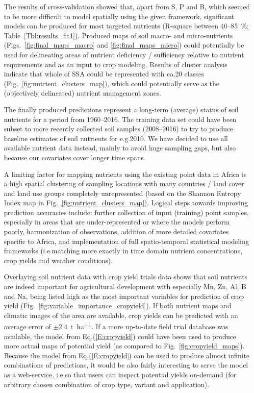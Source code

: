 \begin{linenumbers}
The results of cross-validation showed that, apart from S, P and B, which seemed to be more difficult to model spatially using the given framework, significant models can be produced for most targeted nutrients (R-square between 40--\SI{85}{\percent}; Table~\ref{Tbl:results_fit1}). Produced maps of soil macro- and micro-nutrients (Figs.\@~\ref{fig:final_maps_macro} and \ref{fig:final_maps_micro}) could potentially be used for delineating areas of nutrient deficiency / sufficiency relative to nutrient requirements and as an input to crop modeling. Results of cluster analysis indicate that whole of SSA could be represented with ca.\@ 20 classes (Fig.\@~\ref{fig:nutrient_clusters_map}), which could potentially serve as the (objectively delineated) nutrient management zones.\par 

The finally produced predictions represent a long-term (average) status of soil nutrients for a period from 1960--2016. The training data set could have been subset to more recently collected soil samples (2008--2016) to try to produce baseline estimates of soil nutrients for e.g.\@ 2010. We have decided to use all available nutrient data instead, mainly to avoid huge sampling gaps, but also because our covariates cover longer time spans.\par

A limiting factor for mapping nutrients using the existing point data in Africa is a high spatial clustering of sampling locations with many countries / land cover and land use groups completely unrepresented (based on the Shannon Entropy Index map in Fig.\@~\ref{fig:nutrient_clusters_map}). Logical steps towards improving prediction accuracies include: further collection of input (training) point samples, especially in areas that are under-represented or where the models perform poorly, harmonization of observations, addition of more detailed covariates specific to Africa, and implementation of full spatio-temporal statistical modeling frameworks (i.e.\@ matching more exactly in time domain nutrient concentrations, crop yields and weather conditions).\par

Overlaying soil nutrient data with crop yield trials data shows that soil nutrients are indeed important for agricultural development with especially Mn, Zn, Al, B and Na, being listed high as the most important variables for prediction of crop yield (Fig.\@~\ref{fig:variable_importance_cropyield}). If both nutrient maps and climatic images of the area are available, crop yields can be predicted with an average error of $\pm$\SI{2.4}{\tonne\per\hectare}. If a more up-to-date field trial database was available, the model from Eq.(\ref{E:cropyield}) could have been used to produce more actual maps of potential yield (as compared to Fig.\@~\ref{fig:cropyield_maps}). Because the model from Eq.(\ref{E:cropyield}) can be used to produce almost infinite combinations of predictions, it would be also fairly interesting to serve the model as a web-service, i.e.\@ so that users can inspect potential yields on-demand (for arbitrary chosen combination of crop type, variant and application).\par


\end{linenumbers}

